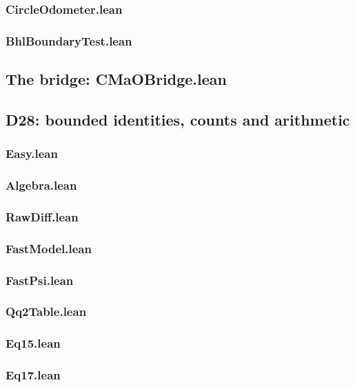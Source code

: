 \documentclass[11pt]{article}
\theoremstyle{definition}
\begin{document}
\subsubsection*{CircleOdometer.lean}
\subsubsection*{BhlBoundaryTest.lean}
\subsection*{The bridge: CMaOBridge.lean}
\subsection*{D28: bounded identities, counts and arithmetic}
\subsubsection*{Easy.lean}
\subsubsection*{Algebra.lean}
\subsubsection*{RawDiff.lean}
\subsubsection*{FastModel.lean}
\subsubsection*{FastPsi.lean}
\subsubsection*{Qq2Table.lean}
\subsubsection*{Eq15.lean}
\subsubsection*{Eq17.lean}
\end{document}
